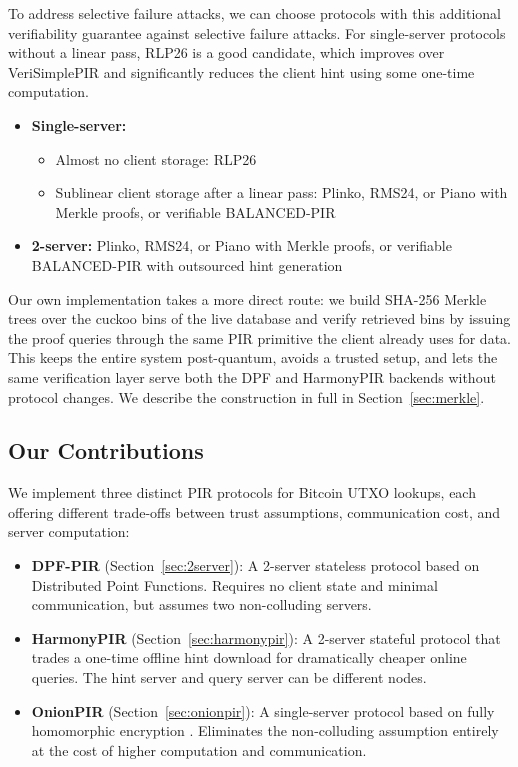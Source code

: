 To address selective failure attacks, we can choose protocols with this additional verifiability guarantee against selective failure attacks. For single-server protocols without a linear pass, RLP26 \cite{rlp26} is a good candidate, which improves over VeriSimplePIR \cite{cl24} and significantly reduces the client hint using some one-time computation.
\begin{itemize}[nolistsep,leftmargin=*]
    \item \textbf{Single-server:}
    \smallskip
    \begin{itemize}[nolistsep,leftmargin=*]
        \item Almost no client storage: RLP26 \cite{rlp26}

        \item Sublinear client storage after a linear pass: Plinko, RMS24, or Piano with Merkle proofs, or verifiable BALANCED-PIR \cite{ar26}
    \end{itemize}

    \smallskip
    \item \textbf{2-server:} Plinko, RMS24, or Piano with Merkle proofs, or verifiable BALANCED-PIR with outsourced hint generation
\end{itemize}

Our own implementation takes a more direct route: we build SHA-256 Merkle trees over the cuckoo bins of the live database and verify retrieved bins by issuing the proof queries through the same PIR primitive the client already uses for data. This keeps the entire system post-quantum, avoids a trusted setup, and lets the same verification layer serve both the DPF and HarmonyPIR backends without protocol changes. We describe the construction in full in Section~\ref{sec:merkle}.

\subsection{Our Contributions}

We implement three distinct PIR protocols for Bitcoin UTXO lookups, each offering different trade-offs between trust assumptions, communication cost, and server computation:
\begin{itemize}[nolistsep,leftmargin=*]
    \item \textbf{DPF-PIR} (Section~\ref{sec:2server}): A 2-server stateless protocol based on Distributed Point Functions. Requires no client state and minimal communication, but assumes two non-colluding servers.
    \item \textbf{HarmonyPIR} (Section~\ref{sec:harmonypir}): A 2-server stateful protocol \cite{ar26fpe} that trades a one-time offline hint download for dramatically cheaper online queries. The hint server and query server can be different nodes.
    \item \textbf{OnionPIR} (Section~\ref{sec:onionpir}): A single-server protocol based on fully homomorphic encryption \cite{onionpir21,onionpirv2}. Eliminates the non-colluding assumption entirely at the cost of higher computation and communication.
\end{itemize}

